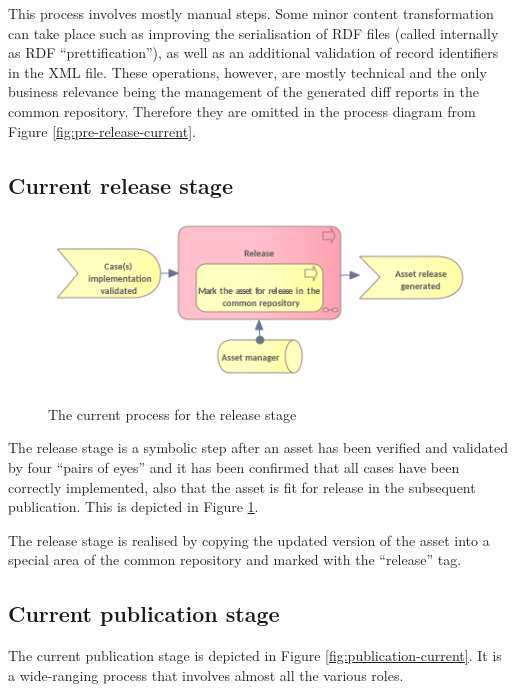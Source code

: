 	This process involves mostly manual steps. Some minor content transformation can take place such as improving the serialisation of RDF files (called internally as RDF ``prettification''), as well as an additional validation of record identifiers in the XML file. These operations, however, are mostly technical and the only business relevance being the management of the generated diff reports in the common repository. Therefore they are omitted in the process diagram from Figure \ref{fig:pre-release-current}. 

	\subsection{Current release stage}
	\label{sec:release-current}
	
	\begin{figure}[h]
		\centering
		\includegraphics[width=.6\textwidth]{images/business/current/Release.png}
		\caption{The current process for the release stage}
		\label{fig:release-current}
	\end{figure}

	The release stage is a symbolic step after an asset has been verified and validated by four ``pairs of eyes'' and it has been confirmed that all cases have been correctly implemented, also that the asset is fit for release in the subsequent publication. This is depicted in Figure \ref{fig:release-current}.

	The release stage is realised by copying the updated version of the asset into a special area of the common repository and marked with the ``release'' tag.

	\subsection{Current publication stage}
	
	The current publication stage is depicted in Figure \ref{fig:publication-current}. It is a wide-ranging process that involves almost all the various roles. 
	
